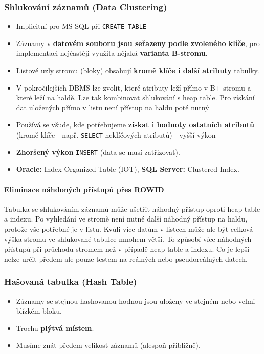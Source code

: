 \subsubsection{Shlukování záznamů (Data Clustering)}
\begin{itemize}
\item Implicitní pro MS-SQL při \texttt{CREATE TABLE}
\item Záznamy v \textbf{datovém souboru jsou seřazeny podle zvoleného klíče}, pro implementaci nejčastěji využita nějaká \textbf{varianta B-stromu}.
\item Listové uzly stromu (bloky) obsahují \textbf{kromě klíče i další atributy} tabulky.
\item V pokročilejších DBMS lze zvolit, které atributy leží přímo v B+ stromu a které leží na haldě. Lze tak kombinovat shlukování s heap table. Pro získání dat uložených přímo v listu není přístup na haldu poté nutný
\item Používá se všude, kde potřebujeme \textbf{získat i hodnoty ostatních atributů} (kromě klíče - např. \texttt{SELECT} neklíčových atributů) - vyšší výkon
\item \textbf{Zhoršený výkon} \texttt{INSERT} (data se musí zatřizovat).
\item \textbf{Oracle:} Index Organized Table (IOT), \textbf{SQL Server:} Clustered Index.
\end{itemize}

\paragraph{Eliminace náhdoných přístupů přes ROWID} Tabulka se shlukováním záznamů může ušetřit náhodný přístup oproti heap table a indexu. Po vyhledání ve stromě není nutné další náhodný přístup na haldu, protože vše potřebné je v listu. Kvůli více datům v listech může ale být celková výška stromu ve shlukované tabulce mnohem větší. To způsobí více náhodných přístupů při průchodu stromem než  v případě heap table a indexu. Co je lepší nelze určit předem ale pouze testem na reálných nebo pseudoreálných datech.

\subsubsection{Hašovaná tabulka (Hash Table)}
\begin{itemize}
\item Záznamy se stejnou hashovanou hodnou jsou uloženy ve stejném nebo velmi blízkém bloku.
\item Trochu \textbf{plýtvá místem}.
\item Musíme znát předem velikost záznamů (alespoň přibližně).
\end{itemize}

